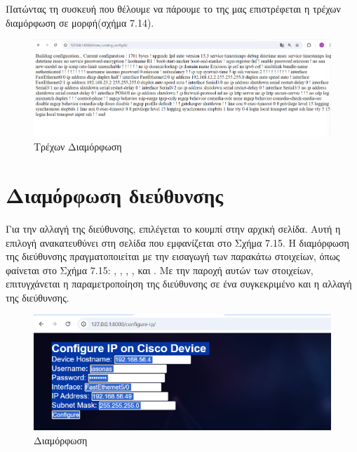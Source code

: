 \FloatBarrier


\noindent Πατώντας τη συσκευή που θέλουμε να πάρουμε το  της μας επιστρέφεται η τρέχων διαμόρφωση σε  μορφή(σχήμα 7.14).



\FloatBarrier

\begin{figure}[h]
	\centering
	\includegraphics[width=1.0\textwidth]{graphics/running_config.png}
	\caption{Τρέχων Διαμόρφωση}
\end{figure}

\FloatBarrier


\section{Διαμόρφωση διεύθυνσης }

Για την αλλαγή της  διεύθυνσης, επιλέγεται το κουμπί  στην αρχική σελίδα. Αυτή η επιλογή ανακατευθύνει στη σελίδα  που εμφανίζεται στο Σχήμα 7.15. Η διαμόρφωση της  διεύθυνσης πραγματοποιείται με την εισαγωγή των παρακάτω στοιχείων, όπως φαίνεται στο Σχήμα 7.15: , , , ,  και . Με την παροχή αυτών των στοιχείων, επιτυγχάνεται η παραμετροποίηση της  διεύθυνσης σε ένα συγκεκριμένο  και η αλλαγή της διεύθυνσης.

\FloatBarrier

\begin{figure}[h]
	\centering
	\includegraphics[width=1.0\textwidth]{graphics/configure_ip.png}
	\caption{Διαμόρφωση}
\end{figure}

